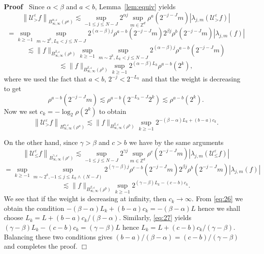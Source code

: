 \documentclass[a4paper,11pt]{article}
\newenvironment{proof}{\noindent\textbf{Proof\ }}{\hspace*{\fill}$\Box$\medskip}
\numberwithin{equation}{section}
\newcommand{\UU}{\mathscr{U}}
\begin{document}
\begin{proof}
  Since $\alpha < \beta$ and $a < b$,  Lemma~\ref{lem:equiv} yields
  \[ \left\| \UU_{>}^{\varepsilon} f \right\|_{B^{\alpha,
     \varepsilon}_{\infty, \infty} (\rho^a)} \lesssim \sup_{- 1 \leqslant j
     \leqslant N - J} 2^{\alpha j} \sup_{m \in \mathbb{Z}^d} \rho^a (2^{- j -
     J} m) \left| \lambda_{j, m} \left( \UU^{\varepsilon}_{>} f \right)
     \right| \]
  \[ = \sup_{k \geqslant - 1} \sup_{m \sim 2^k, L_k < j \leqslant N - J}
     2^{(\alpha - \beta) j} \rho^{a - b} (2^{- j - J} m) 2^{\beta j} \rho^b
     (2^{- j - J} m) | \lambda_{j, m} (f) | \]
  \[ \lesssim \| f \|_{B^{\beta, \varepsilon}_{\infty, \infty} (\rho^b)}
     \sup_{k \geqslant - 1} \sup_{m \sim 2^k, L_k < j \leqslant N - J}
     2^{(\alpha - \beta) j} \rho^{a - b} (2^{- j - J} m) \]
  \[ \lesssim \| f \|_{B^{\beta, \varepsilon}_{\infty, \infty} (\rho^b)}
     \sup_{k \geqslant - 1} 2^{(\alpha - \beta) L_k} \rho^{a - b} (2^k), \]
  where we used the fact that $a < b$, $2^{- j} < 2^{- L_k}$ and that the
  weight is decreasing to get
  \[ \rho^{a - b} (2^{- j - J} m) \lesssim \rho^{a - b} (2^{- L_k - J} 2^k)
     \lesssim \rho^{a - b} (2^k) . \]
  Now we set $c_k = - \log_2 \rho (2^k)$ to obtain
  \begin{equation}
    \left\| \UU_{>}^{\varepsilon} f \right\|_{B^{\alpha, \varepsilon}_{\infty,
    \infty} (\rho^a)} \lesssim \| f \|_{B^{\beta, \varepsilon}_{\infty,
    \infty} (\rho^b)} \sup_{k \geqslant - 1} 2^{- (\beta - \alpha) L_k + (b -
    a) c_k} . \label{eq:26}
  \end{equation}
  
  
  On the other hand, since $\gamma > \beta$ and $c > b$ we have by the same
  arguments
  \[ \left\| \UU^{\varepsilon}_{\leqslant} f \right\|_{B^{\gamma,
     \varepsilon}_{\infty, \infty} (\rho^c)} \lesssim \sup_{- 1 \leqslant j
     \leqslant N - J} 2^{\gamma j} \sup_{m \in \mathbb{Z}^d} \rho^c (2^{- j -
     J} m) \left| \lambda_{j, m} \left( \UU_{\leqslant}^{\varepsilon} f
     \right) \right| \]
  \[ = \sup_{k \geqslant - 1} \sup_{m \sim 2^k, - 1 \leqslant j \leqslant L_k
     \wedge (N - J)} 2^{(\gamma - \beta) j} \rho^{c - b} (2^{- j - J} m)
     2^{\beta j} \rho^b (2^{- j - J} m) | \lambda_{j, m} (f) | \]
  \begin{equation}
    \lesssim \| f \|_{B^{\beta, \varepsilon}_{\infty, \infty} (\rho^b)}
    \sup_{k \geqslant - 1} 2^{(\gamma - \beta) L_k - (c - b) c_k} .
    \label{eq:27}
  \end{equation}
  We see that if the weight is decreasing at infinity, then $c_k
  \rightarrow \infty$. From {\eqref{eq:26}} we obtain the condition $- (\beta
  - \alpha) L_k + (b - a) c_k = - (\beta - \alpha) L$ hence we shall choose
  $L_k = L + (b - a) c_k / (\beta - \alpha)$. Similarly, {\eqref{eq:27}}
  yields $(\gamma - \beta) L_k - (c - b) c_k = (\gamma - \beta) L$ hence $L_k
  = L + (c - b) c_k / (\gamma - \beta)$. Balancing these two conditions gives
  $(b - a) / (\beta - \alpha) = (c - b) / (\gamma - \beta)$ and completes the
  proof.
  \end{proof}
  
\end{document}
